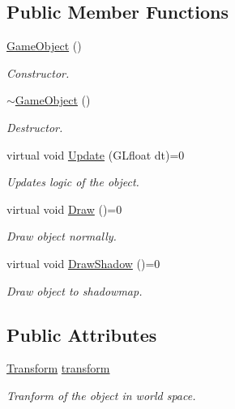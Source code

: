 \subsection*{Public Member Functions}
\begin{DoxyCompactItemize}
\item 
\mbox{\hyperlink{class_game_object_a0348e3ee2e83d56eafca7a3547f432c4}{Game\+Object}} ()
\begin{DoxyCompactList}\small\item\em Constructor. \end{DoxyCompactList}\item 
\mbox{\hyperlink{class_game_object_ab82dfdb656f9051c0587e6593b2dda97}{$\sim$\+Game\+Object}} ()
\begin{DoxyCompactList}\small\item\em Destructor. \end{DoxyCompactList}\item 
virtual void \mbox{\hyperlink{class_game_object_aa100c768006aca3e7cdbabe27b48b9e5}{Update}} (G\+Lfloat dt)=0
\begin{DoxyCompactList}\small\item\em Updates logic of the object. \end{DoxyCompactList}\item 
virtual void \mbox{\hyperlink{class_game_object_a29a665f46fda87982825bc5c0ca6a888}{Draw}} ()=0
\begin{DoxyCompactList}\small\item\em Draw object normally. \end{DoxyCompactList}\item 
virtual void \mbox{\hyperlink{class_game_object_a78bf45c8ef3805247435583556087788}{Draw\+Shadow}} ()=0
\begin{DoxyCompactList}\small\item\em Draw object to shadowmap. \end{DoxyCompactList}\end{DoxyCompactItemize}
\subsection*{Public Attributes}
\begin{DoxyCompactItemize}
\item 
\mbox{\hyperlink{class_transform}{Transform}} \mbox{\hyperlink{class_game_object_ad2de7705e8d1d7b5d0014448dd13f99a}{transform}}
\begin{DoxyCompactList}\small\item\em Tranform of the object in world space. \end{DoxyCompactList}\end{DoxyCompactItemize}


